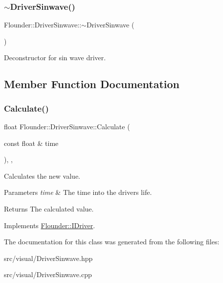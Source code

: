\subsubsection{\texorpdfstring{$\sim$\+Driver\+Sinwave()}{~DriverSinwave()}}
{\footnotesize\ttfamily Flounder\+::\+Driver\+Sinwave\+::$\sim$\+Driver\+Sinwave (\begin{DoxyParamCaption}{ }\end{DoxyParamCaption})}



Deconstructor for sin wave driver. 



\subsection{Member Function Documentation}
\mbox{\label{class_flounder_1_1_driver_sinwave_acb475a9bad5c9ae3d67ff3e74ce8bbb9}} 
\subsubsection{\texorpdfstring{Calculate()}{Calculate()}}
{\footnotesize\ttfamily float Flounder\+::\+Driver\+Sinwave\+::\+Calculate (\begin{DoxyParamCaption}\item[{const float \&}]{time }\end{DoxyParamCaption})\hspace{0.3cm}{\ttfamily [override]}, {\ttfamily [protected]}, {\ttfamily [virtual]}}



Calculates the new value. 


\begin{DoxyParams}{Parameters}
{\em time} & The time into the drivers life. \\
\hline
\end{DoxyParams}
\begin{DoxyReturn}{Returns}
The calculated value. 
\end{DoxyReturn}


Implements \hyperlink{class_flounder_1_1_i_driver_a969f0c8da089f9d17129ee12b40c354a}{Flounder\+::\+I\+Driver}.



The documentation for this class was generated from the following files\+:\begin{DoxyCompactItemize}
\item 
src/visual/Driver\+Sinwave.\+hpp\item 
src/visual/Driver\+Sinwave.\+cpp\end{DoxyCompactItemize}
